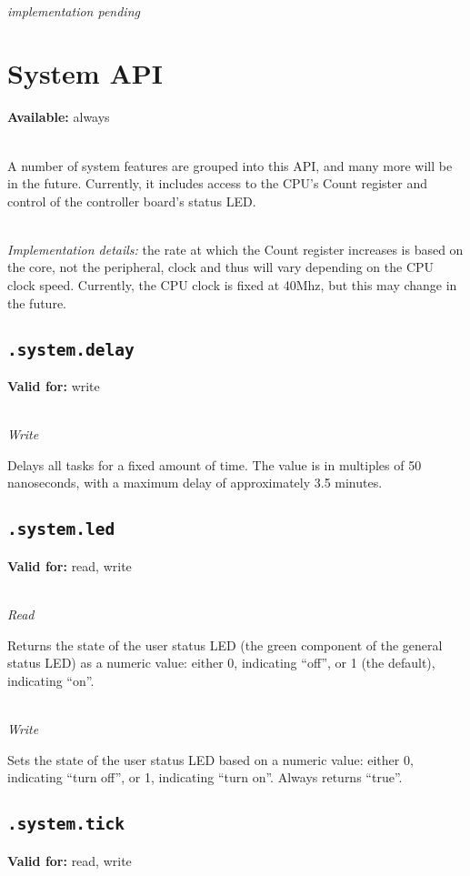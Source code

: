 \documentclass{article}
\begin{document}
~\\
\textit{implementation pending}

\section{System API}
\textbf{Available:} always

~\\
A number of system features are grouped into this API, and many more will be in the future. Currently, it includes access to the CPU's Count register and control of the controller board's status LED.

~\\
\textit{Implementation details:} the rate at which the Count register increases is based on the core, not the peripheral, clock and thus will vary depending on the CPU clock speed.
Currently, the CPU clock is fixed at 40Mhz, but this may change in the future.

\subsection{\texttt{.system.delay}}
\textbf{Valid for:} write

~\\
\textit{Write}

Delays all tasks for a fixed amount of time. The value is in multiples of 50 nanoseconds, with a maximum delay of approximately 3.5 minutes.

\subsection{\texttt{.system.led}}
\textbf{Valid for:} read, write

~\\
\textit{Read}

Returns the state of the user status LED (the green component of the general status LED) as a numeric value: either 0, indicating ``off'', or 1 (the default), indicating ``on''.

~\\
\textit{Write}

Sets the state of the user status LED based on a numeric value: either 0, indicating ``turn off'', or 1, indicating ``turn on''. Always returns ``true''.

\subsection{\texttt{.system.tick}}
\textbf{Valid for:} read, write
\end{document}
